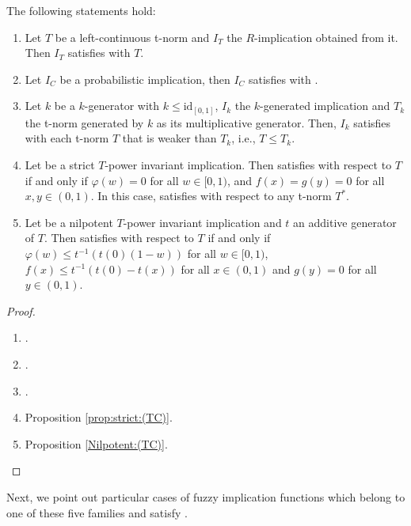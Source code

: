 \begin{corollary}\label{cor:(TC)}
The following statements hold:
	\begin{enumerate}[label=(\roman*)]
		\item Let $T$ be a left-continuous t-norm and $I_T$ the $R$-implication obtained from it. Then $I_T$ satisfies \TC with $T$.
		\item Let $I_C$ be a probabilistic implication, then $I_C$ satisfies \TC with \TP.
		\item Let $k$ be a $k$-generator with $k \leq \text{id}_{[0,1]}$, $I_k$ the $k$-generated implication and $T_k$ the t-norm generated by $k$ as its multiplicative generator. Then, $I_k$ satisfies \TC with each t-norm $T$ that is weaker than $T_k$, i.e., $T \leq T_k$.
		\item Let \IT be a strict $T$-power invariant implication. Then \IT satisfies  \TC with respect to $T$ if and only if $\varphi(w)=0$ for all $w \in [0,1)$, and $f(x)=g(y)=0$ for all $x,y \in (0,1)$. In this case, \IT satisfies \TC with respect to any t-norm $T^*$.
		\item 	Let \IT be a nilpotent $T$-power invariant implication and $t$ an additive generator of $T$. Then \IT satisfies  \TC with respect to $T$ if and only if $\varphi(w) \leq t^{-1} \left(t(0)(1-w)\right)$ for all $w \in [0,1)$, $f(x) \leq t^{-1}(t(0)-t(x))$ for all $x \in (0,1)$ and $g(y)=0$ for all $y \in (0,1)$.
	\end{enumerate}
\end{corollary}
\begin{proof}
	\begin{enumerate}[label=(\roman*)]
		\item \cite[Theorem 7.4.8]{Baczynski2008}.
		\item \cite[Proposition 4.3]{Baczynski2016}.
		\item \cite[Proposition 11]{Zhou2021}.
		\item Proposition \ref{prop:strict:(TC)}.
		\item Proposition \ref{Nilpotent:(TC)}.
	\end{enumerate}
\end{proof}

Next, we point out particular cases of fuzzy implication functions which belong to one of these five families and satisfy \MTC.

